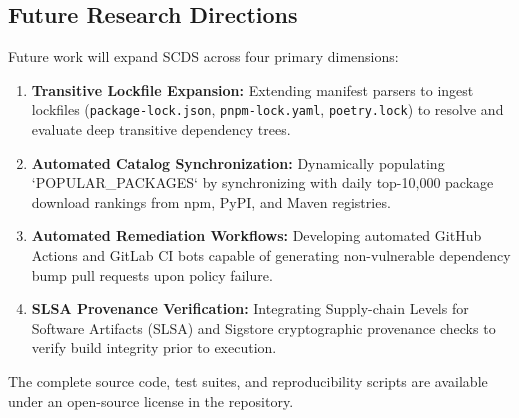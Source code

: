 \subsection{Future Research Directions}
Future work will expand SCDS across four primary dimensions:
\begin{enumerate}
    \item \textbf{Transitive Lockfile Expansion:} Extending manifest parsers to ingest lockfiles (\texttt{package-lock.json}, \texttt{pnpm-lock.yaml}, \texttt{poetry.lock}) to resolve and evaluate deep transitive dependency trees.
    \item \textbf{Automated Catalog Synchronization:} Dynamically populating `POPULAR\_PACKAGES` by synchronizing with daily top-10,000 package download rankings from npm, PyPI, and Maven registries.
    \item \textbf{Automated Remediation Workflows:} Developing automated GitHub Actions and GitLab CI bots capable of generating non-vulnerable dependency bump pull requests upon policy failure.
    \item \textbf{SLSA Provenance Verification:} Integrating Supply-chain Levels for Software Artifacts (SLSA) and Sigstore cryptographic provenance checks to verify build integrity prior to execution.
\end{enumerate}

The complete source code, test suites, and reproducibility scripts are available under an open-source license in the repository.
